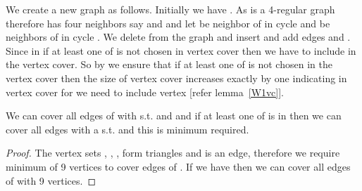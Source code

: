 \documentclass[svgnames]{llncs}
\begin{document}
{We create a new graph  as follows. Initially we have .
As  is a 4-regular graph therefore  has four neighbors say  and  and
let  be neighbor of  in cycle 
and  be neighbors of  in cycle .
We delete  from the graph  and insert  and add edges  and . Since in 
if at least one of  is not chosen in vertex cover then we have to include  in the vertex cover. So by  we ensure that if at least one of
 is not chosen in the vertex cover then the size of vertex cover increases exactly by one indicating in vertex cover for  we need to include vertex 
[refer lemma~\ref{W1vc}].




\begin{lemma}
We can cover all edges of  with  s.t.  and  and
if at least one of  is in  then we can cover all edges with a  s.t.
 and this is minimum required.
\label{W1vc}
\end{lemma}
\begin{proof}
The vertex sets , , ,  form triangles
and  is an edge, therefore we require minimum of 9 vertices to cover edges of . If we have  then we can cover all edges of  with 9 vertices.



\end{proof}}
\end{document}
